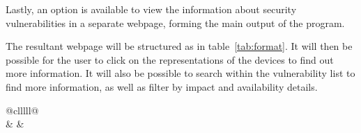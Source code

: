   Lastly, an option is available to view the information about security
  vulnerabilities in a separate webpage, forming the main output of the
  program.

  The resultant webpage will be structured as in table~\ref{tab:format}.  It
  will then be possible for the user to click on the representations of the
  devices to find out more information.  It will also be possible to search
  within the vulnerability list to find more information, as well as filter by
  impact and availability details.

  \begin{table}[] \centering \begin{tabular}{@{}clllll@{}} \toprule
                                                                                                                                                                                                                                          \\
    \midrule {} &  &  \\
                                                                                                                                                                                                    \\
                                                                                                                                                                                      \\
                                                      \\
                                                                                                                                                                                                                \\
    \bottomrule \end{tabular} \caption{Format of presented data found in e-mail
    header}\label{tab:format} \end{table}

